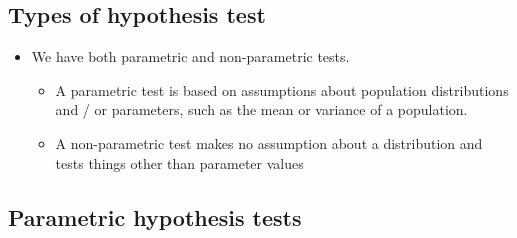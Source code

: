 \documentclass[../notes_compiled.tex]{subfiles}
\begin{document}
\subsection{Types of hypothesis test}
\begin{itemize}
\item We have both parametric and non-parametric tests.
\begin{itemize}
\item A parametric test is based on assumptions about population distributions and / or parameters, such as the mean or variance of a population. 
\item A non-parametric test makes no assumption about a distribution and tests things other than parameter values
\end{itemize}
\end{itemize}
\subsection{Parametric hypothesis tests}
\end{document}
